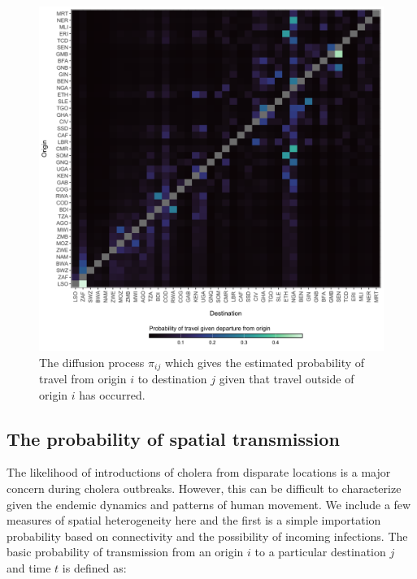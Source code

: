 \documentclass[
]{book}
\begin{document}
\begin{figure}

{\centering \includegraphics[width=1\linewidth]{figures/mobility_diffusion_pi} 

}

\caption{The diffusion process $\pi_{ij}$ which gives the estimated probability of travel from origin $i$ to destination $j$ given that travel outside of origin $i$ has occurred.}\label{fig:mobility-diffusion}
\end{figure}

\subsection{The probability of spatial transmission}\label{the-probability-of-spatial-transmission}

The likelihood of introductions of cholera from disparate locations is a major concern during cholera outbreaks. However, this can be difficult to characterize given the endemic dynamics and patterns of human movement. We include a few measures of spatial heterogeneity here and the first is a simple importation probability based on connectivity and the possibility of incoming infections. The basic probability of transmission from an origin \(i\) to a particular destination \(j\) and time \(t\) is defined as:
\end{document}
